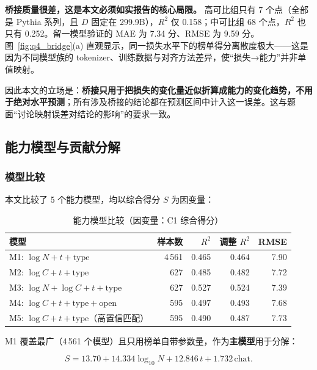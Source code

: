 \textbf{桥接质量很差，这是本文必须如实报告的核心局限。} 高可比组只有 7 个点（全部是 Pythia 系列，且 $D$ 固定在 299.9B），$R^2$ 仅 0.158；中可比组 68 个点，$R^2$ 也只有 0.252。留一模型验证的 MAE 为 7.34 分、RMSE 为 9.59 分。图~\ref{fig:q4_bridge}(a) 直观显示，同一损失水平下的榜单得分离散度极大——这是因为不同模型族的 tokenizer、训练数据与对齐方法差异，使``损失→能力''并非单值映射。

因此本文的立场是：\textbf{桥接只用于把损失的变化量近似折算成能力的变化趋势，不用于绝对水平预测}；所有涉及桥接的结论都在预测区间中计入这一误差。这与题面``讨论映射误差对结论的影响''的要求一致。

\subsection{能力模型与贡献分解}

\subsubsection{模型比较}

本文比较了 5 个能力模型，均以综合得分 $S$ 为因变量：

\begin{table}[htbp]
\centering
\caption{能力模型比较（因变量：C1 综合得分）}
\label{tab:q4_model}
\small
\begin{tabular}{l|r|r|r|r}
\toprule
\textbf{模型} & \textbf{样本数} & \textbf{$R^2$} & \textbf{调整 $R^2$} & \textbf{RMSE} \\
\midrule
M1: $\log N+t+\text{type}$ & 4\,561 & 0.465 & 0.464 & 7.90 \\
M2: $\log C+t+\text{type}$ & 627 & 0.485 & 0.482 & 7.72 \\
M3: $\log N+\log C+t+\text{type}$ & 627 & 0.527 & 0.524 & 7.39 \\
M4: $\log C+t+\text{type}+\text{open}$ & 595 & 0.497 & 0.493 & 7.68 \\
M5: $\log C+t+\text{type}$（高置信匹配） & 595 & 0.490 & 0.487 & 7.73 \\
\bottomrule
\end{tabular}
\end{table}

M1 覆盖最广（4\,561 个模型）且只用榜单自带参数量，作为\textbf{主模型}用于分解：

\begin{equation}
S=13.70+14.334\log_{10}N+12.846\,t+1.732\,\text{chat}.
\label{eq:q4_main}
\end{equation}

